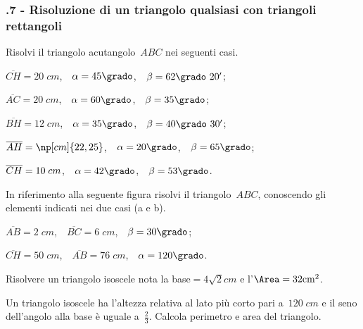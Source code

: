 \subsubsection*{\thechapter.7 - Risoluzione di un triangolo qualsiasi con triangoli rettangoli}

\begin{esercizio}
\label{ese:G.22}
Risolvi il triangolo acutangolo~$ABC$ nei seguenti casi.
\begin{multicols}{2}
\begin{enumeratea}
\item $\overline{CH}=20\;\unit{cm}$,~~$\alpha=45\grado$,~~$\beta=62\grado~20'$;
\item $\overline{AC}=20\;\unit{cm}$,~~$\alpha=60\grado$,~~$\beta=35\grado$;
\item $\overline{BH}=12\;\unit{cm}$,~~$\alpha=35\grado$,~~$\beta=40\grado~30'$;
\item $\overline{AH}=\np[cm]{22,25}$,~~$\alpha=20\grado$,~~$\beta=65\grado$;
\item $\overline{CH}=10\unit\;{cm}$,~~$\alpha=42\grado$,~~$\beta=53\grado$.
\end{enumeratea}
\end{multicols}
\end{esercizio}

\begin{esercizio}
\label{ese:G.23}
In riferimento alla seguente figura risolvi il triangolo~$ABC$, conoscendo gli elementi indicati nei due casi (a e b).
\begin{center}
  
\end{center}
\begin{multicols}{2}
 \begin{enumeratea}
\item $\overline{AB}=2\;\unit{cm}$,~~$\overline{BC}=6\;\unit{cm}$,~~$\beta=30\grado$;
\item $\overline{CH}=50\;\unit{cm}$,~~$\overline{AB}=76\;\unit{cm}$,~~$\alpha=120\grado$.
\end{enumeratea}
\end{multicols}
\end{esercizio}

\begin{multicols}{2}
\begin{esercizio}
\label{ese:G.24}
Risolvere un triangolo isoscele nota la base$=4\sqrt{2}\unit{cm}$ e l'$\Area=32\unit{cm^2}$.
\end{esercizio}

\begin{esercizio}
\label{ese:G.25}
Un triangolo isoscele ha l'altezza relativa al lato più corto pari a~$120\;\unit{cm}$ e il seno dell'angolo alla base è uguale a~$\frac{2}{3}$.
Calcola perimetro e area del triangolo.
\end{esercizio}
\end{multicols}

